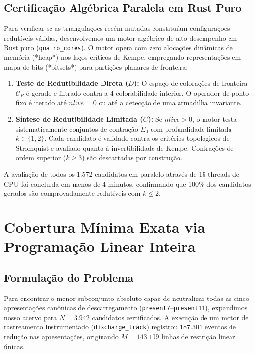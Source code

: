 \documentclass[11pt,a4paper]{article}
\theoremstyle{plain}
\theoremstyle{definition}
\begin{document}
\subsection{Certificação Algébrica Paralela em Rust Puro}

Para verificar se as triangulações recém-mutadas constituíam configurações redutíveis válidas, desenvolvemos um motor algébrico de alto desempenho em Rust puro (\texttt{quatro\_cores}). O motor opera com zero alocações dinâmicas de memória (*heap*) nos laços críticos de Kempe, empregando representações em mapa de bits (*bitsets*) para partições planares de fronteira:
\begin{enumerate}
    \item \textbf{Teste de Redutibilidade Direta ($D$):} O espaço de colorações de fronteira $\mathcal{C}_R$ é gerado e filtrado contra a 4-colorabilidade interior. O operador de ponto fixo é iterado até $nlive = 0$ ou até a detecção de uma armadilha invariante.
    \item \textbf{Síntese de Redutibilidade Limitada ($C$):} Se $nlive > 0$, o motor testa sistematicamente conjuntos de contração $E_0$ com profundidade limitada $k \in \{1, 2\}$. Cada candidato é validado contra os critérios topológicos de Stromquist e avaliado quanto à invertibilidade de Kempe. Contrações de ordem superior ($k \ge 3$) são descartadas por construção.
\end{enumerate}
A avaliação de todos os 1.572 candidatos em paralelo através de 16 threads de CPU foi concluída em menos de 4 minutos, confirmando que 100\% dos candidatos gerados são comprovadamente redutíveis com $k \le 2$.

\section{Cobertura Mínima Exata via Programação Linear Inteira}

\subsection{Formulação do Problema}

Para encontrar o menor subconjunto absoluto capaz de neutralizar todas as cinco apresentações canônicas de descarregamento (\texttt{present7}--\texttt{present11}), expandimos nosso acervo para $N = 3.942$ candidatos certificados. A execução de um motor de rastreamento instrumentado (\texttt{discharge\_}\allowbreak\texttt{track}) registrou $187.301$ eventos de redução nas apresentações, originando $M = 143.109$ linhas de restrição linear únicas.
\end{document}
